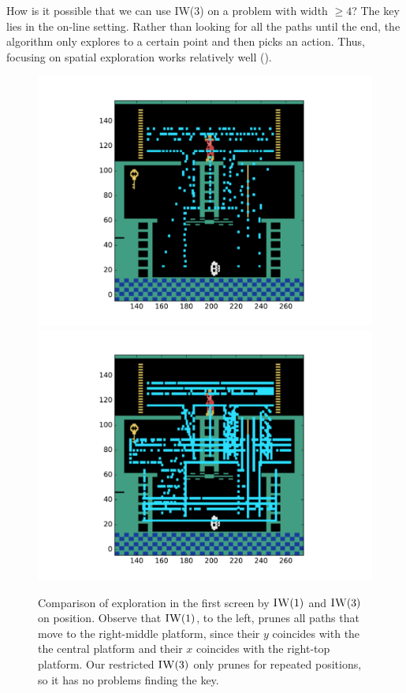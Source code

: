 How is it possible that we can use \ac{IW}(3) on a problem with width $\geq 4$?
The key lies in the on-line setting. Rather than looking for all the paths until
the end, the algorithm only explores to a certain point and then picks an
action. Thus, focusing on spatial exploration works relatively well
().
\begin{figure}[hbtp]
\begin{center}
\includegraphics[width=\textwidth / 2 -2cm]{img/iw1-explore-thick.pdf}
\includegraphics[width=\textwidth / 2 -2cm]{img/iw3-explore-thick.pdf}
\end{center}
\caption[Comparison of exploration in the first screen by $\textsc{IW}(1)$ and
$\textsc{IW}(3)$ on position.]
{Comparison of exploration in the first screen by $\textsc{IW}(1)$ and
$\textsc{IW}(3)$ on position. Observe that $\textsc{IW}(1)$, to the left, prunes
all paths that move to the right-middle platform, since their $y$ coincides with the
the central platform and their $x$ coincides with the right-top platform.
Our restricted $\textsc{IW}(3)$ only prunes for repeated positions, so it has no
problems finding the key.}
\label{fig:iw-1-3}
\end{figure}

